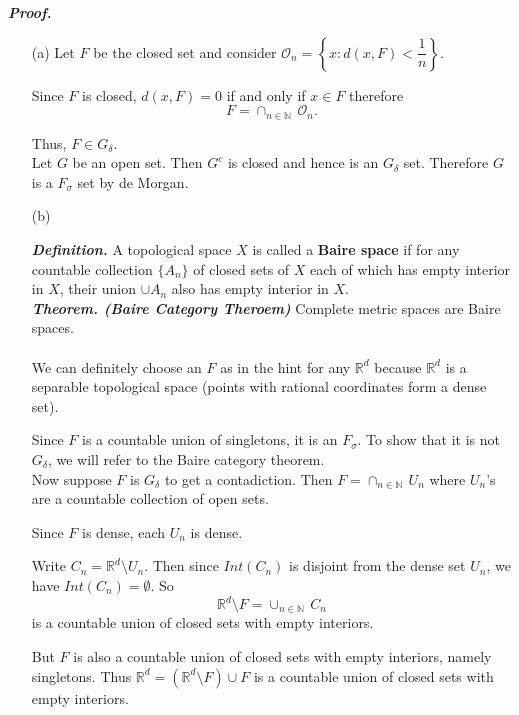\documentclass[a4paper,11pt]{article}
\begin{document}
\textbf{\textit{Proof.}}
\begin{enumerate}
	\item [(a)] Let $F$ be the closed set and consider $\mathcal{O}_n = \left\{x:d(x,F) < \dfrac{1}{n} \right\}$.

	Since $F$ is closed, $d(x,F) = 0$ if and only if $x \in F$ therefore
		$$F = \cap_{n \in \mathbb{N}}\, \mathcal{O}_n.$$

	Thus, $F \in G_\delta$.\\

	Let $G$ be an open set. Then $G^c$ is closed and hence is an $G_\delta$ set. Therefore $G$ is a $F_\sigma$ set by de Morgan.\\

	\item [(b)]

	\textit{\textbf{Definition.}} A topological space $X$ is called a \textbf{Baire space} if for any countable collection $\{A_n\}$ of closed sets of $X$ each of which has empty interior in $X$, their union $\cup A_n$ also has empty interior in $X$.\\

	\textit{\textbf{Theorem. (Baire Category Theroem)}} Complete metric spaces are Baire spaces.\\\\

	We can definitely choose an $F$ as in the hint for any $\mathbb{R}^d$ because $\mathbb{R}^d$ is a separable topological space (points with rational coordinates form a dense set).

	Since $F$ is a countable union of singletons, it is an $F_\sigma$. To show that it is not $G_\delta$, we will refer to the Baire category theorem.\\

	Now suppose $F$ is $G_\delta$ to get a contadiction. Then $F = \cap_{n \in \mathbb{N}}\, U_n$ where $U_n$'s are a countable collection of open sets.

	Since $F$ is dense, each $U_n$ is dense.

	Write $C_n = \mathbb{R}^d \setminus U_n$. Then since $Int(C_n)$ is disjoint from the dense set $U_n$, we have $Int(C_n) = \emptyset$. So
		$$\mathbb{R}^d \setminus F = \cup_{n \in \mathbb{N}}\,C_n$$
	is a countable union of closed sets with empty interiors.

	But $F$ is also a countable union of closed sets with empty interiors, namely singletons. Thus $\mathbb{R}^d = (\mathbb{R}^d \setminus F) \cup F$ is a countable union of closed sets with empty interiors.


\end{enumerate}
\end{document}
